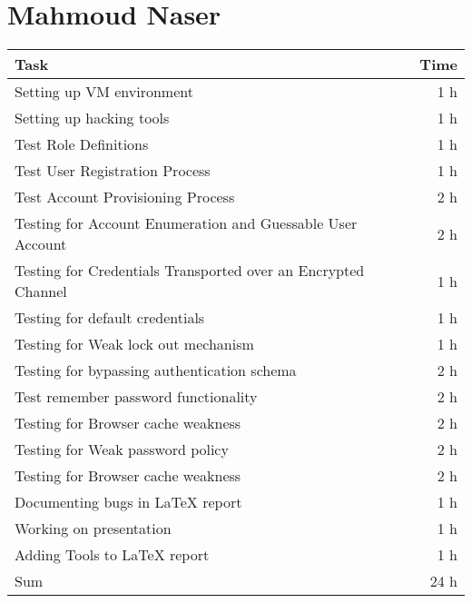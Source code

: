 \section*{Mahmoud Naser}
\begin{table}[h!tpb]
  \centering
  \begin{tabularx}{\textwidth}{X r}
    \toprule
      Task & Time \\
    \midrule
      Setting up VM environment & 1 h \\
      Setting up hacking tools & 1 h \\

      Test Role Definitions & 1 h \\
      Test User Registration Process & 1 h \\
      Test Account Provisioning Process & 2 h \\
      Testing for Account Enumeration and Guessable User Account & 2 h \\

      Testing for Credentials Transported over an Encrypted Channel & 1 h \\
      Testing for default credentials & 1 h \\
      Testing for Weak lock out mechanism & 1 h \\
      Testing for bypassing authentication schema & 2 h \\
      Test remember password functionality & 2 h \\
      Testing for Browser cache weakness & 2 h \\
      Testing for Weak password policy & 2 h \\
      Testing for Browser cache weakness & 2 h \\

      Documenting bugs in \LaTeX{} report & 1 h \\
      Working on presentation & 1 h \\
      Adding Tools to \LaTeX{} report & 1 h \\
    \midrule
      Sum & 24 h \\
    \bottomrule
  \end{tabularx}
\end{table}
